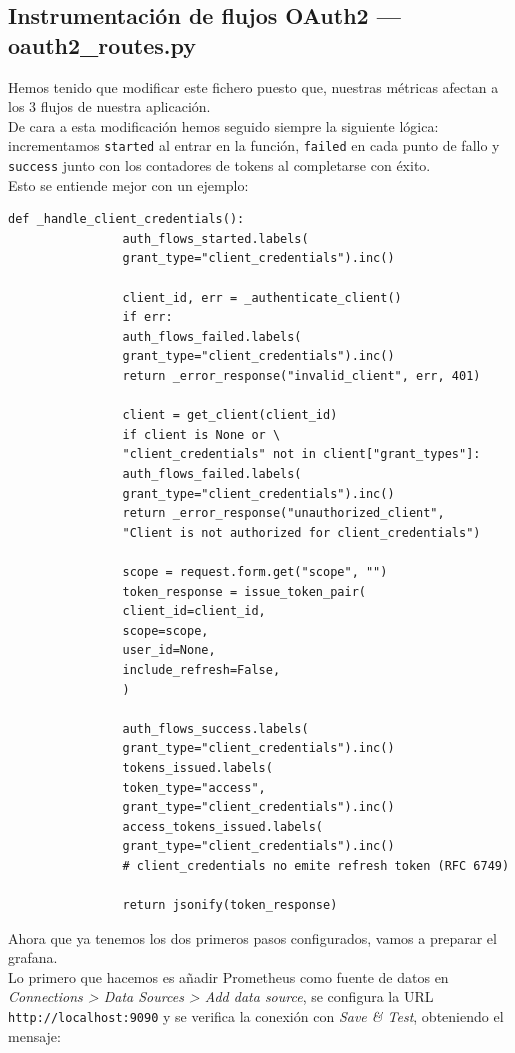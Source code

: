 \documentclass[12pt, a4paper]{article}
\begin{document}
		\subsection{Instrumentación de flujos OAuth2 — oauth2\_routes.py}
			Hemos tenido que modificar este fichero puesto que, nuestras métricas afectan a los 3  flujos de nuestra aplicación.\\
			De cara a esta modificación hemos seguido siempre la siguiente lógica: incrementamos \texttt{started} al entrar en la función, \texttt{failed} en cada punto de fallo y \texttt{success} junto con los contadores de tokens al completarse con éxito.\\
			Esto se entiende mejor con un ejemplo:
			\begin{lstlisting}[style=python, caption=Fragmento de \_handle\_client\_credentials()]
				def _handle_client_credentials():
				auth_flows_started.labels(
				grant_type="client_credentials").inc()
				
				client_id, err = _authenticate_client()
				if err:
				auth_flows_failed.labels(
				grant_type="client_credentials").inc()
				return _error_response("invalid_client", err, 401)
				
				client = get_client(client_id)
				if client is None or \
				"client_credentials" not in client["grant_types"]:
				auth_flows_failed.labels(
				grant_type="client_credentials").inc()
				return _error_response("unauthorized_client",
				"Client is not authorized for client_credentials")
				
				scope = request.form.get("scope", "")
				token_response = issue_token_pair(
				client_id=client_id,
				scope=scope,
				user_id=None,
				include_refresh=False,
				)
				
				auth_flows_success.labels(
				grant_type="client_credentials").inc()
				tokens_issued.labels(
				token_type="access",
				grant_type="client_credentials").inc()
				access_tokens_issued.labels(
				grant_type="client_credentials").inc()
				# client_credentials no emite refresh token (RFC 6749)
				
				return jsonify(token_response)
			\end{lstlisting}
			
			
			Ahora que ya tenemos los dos primeros pasos configurados,  vamos a preparar el grafana.\\
			Lo primero que hacemos es añadir  Prometheus como fuente de datos en \textit{Connections > Data Sources > Add data source}, se configura la URL \texttt{http://localhost:9090} y se verifica la conexión
			con \textit{Save \& Test}, obteniendo el mensaje:
			
\end{document}

